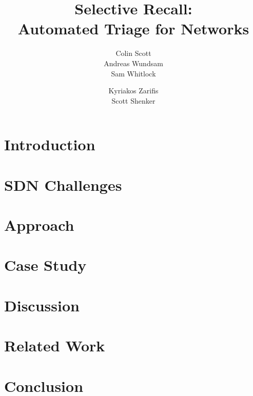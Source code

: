 \documentclass{sig-alt-hotnets}
\title{Selective Recall: \\ Automated Triage for Networks}
\author{
\alignauthor Colin Scott\\
    \affaddr{UC Berkeley}
\alignauthor Andreas Wundsam\\
    \affaddr{ICSI}
\alignauthor Sam Whitlock\\
    \affaddr{ICSI}
\and
\alignauthor Kyriakos Zarifis\\
    \affaddr{ICSI}
\alignauthor Scott Shenker\\
    \affaddr{ICSI \& UC Berkeley}
}
\begin{document}
    \date{}
    \maketitle

    \thispagestyle{empty}

\abstract{{\it }}

\section{Introduction}
\label{sec:intro}


\section{SDN Challenges}
\label{sec:overview}


\section{Approach}
\label{sec:approach}


\section{Case Study}
\label{sec:casestudy}


\section{Discussion}
\label{sec:discussion}


\section{Related Work}
\label{sec:related_work}


\section{Conclusion}
\label{sec:conclusion}


 \small 

%
\end{document}
